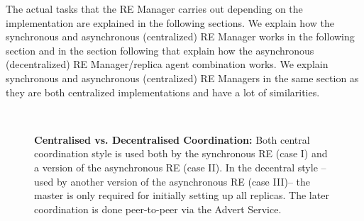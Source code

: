 \documentclass{rspublic}
\newcommand{\alnote}[1]{ {\textcolor{blue} { ***andre: #1 }}}
\newcommand{\alnote}[1]{}
\begin{document}

The actual tasks that the RE Manager carries out depending on the implementation are explained in the following sections. 
We explain how the synchronous and asynchronous (centralized) RE Manager works in the following section and in the section following that explain how the asynchronous (decentralized) RE Manager/replica agent combination works. We explain synchronous and asynchronous (centralized) RE Managers in the same section as they are both centralized implementations and have a lot of similarities. 


\begin{figure}%
\centering
{}\qquad
{}\\
\caption{\textbf{Centralised vs. Decentralised Coordination:} Both
  central coordination style is used both by the synchronous RE (case
  I) and a version of the asynchronous RE (case II).  In the decentral
  style -- used by another version of the asynchronous RE (case III)--
  the master is only required for initially setting up all
  replicas. The later coordination is done peer-to-peer via the Advert
  Service.}
\label{fig:coordination}
\end{figure}
\end{document}
